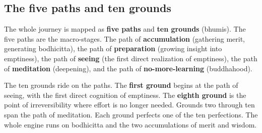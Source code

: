 \subsection{The five paths and ten grounds}

The whole journey is mapped as \textbf{five paths} and \textbf{ten grounds} (bhumis). The five paths are the macro-stages. The path of \textbf{accumulation} (gathering merit, generating bodhicitta), the path of \textbf{preparation} (growing insight into emptiness), the path of \textbf{seeing} (the first direct realization of emptiness), the path of \textbf{meditation} (deepening), and the path of \textbf{no-more-learning} (buddhahood).

The ten grounds ride on the paths. The \textbf{first ground} begins at the path of seeing, with the first direct cognition of emptiness. The \textbf{eighth ground} is the point of irreversibility where effort is no longer needed. Grounds two through ten span the path of meditation. Each ground perfects one of the ten perfections. The whole engine runs on bodhicitta and the two accumulations of merit and wisdom.
